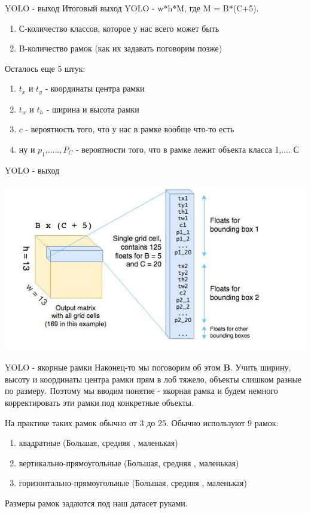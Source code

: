 \documentclass[notes,12pt, aspectratio=169]{beamer}
\begin{document}
\begin{frame}{YOLO - выход}
	Итоговый выход YOLO - w*h*M, где M = B*(C+5).
		\begin{enumerate}
		\item С-количество классов, которое у нас всего может быть
		\item B-количество рамок (как их задавать поговорим позже)
	\end{enumerate}
Осталось еще 5 штук:
\begin{enumerate}
	\item $t_x$ и $t_y$ - координаты центра рамки
	\item $t_w$ и $t_h$ - ширина и высота рамки
	\item $c$ - вероятность того, что у нас в рамке вообще что-то есть
	\item ну и $p_1$,.....$,P_C$ - вероятности того, что в рамке лежит объекта класса 1,.... С
\end{enumerate}
	
\end{frame}

\begin{frame}{YOLO - выход}
\begin{center}
	\includegraphics[width=1\linewidth]{output.jpg}
\end{center}
	
\end{frame}


\begin{frame}{YOLO - якорные рамки}
Наконец-то мы поговорим об этом \textbf{B}. Учить ширину, высоту и координаты центра рамки прям в лоб тяжело, объекты слишком разные по размеру. Поэтому мы вводим понятие - якорная рамка и будем немного корректировать эти рамки под конкретные объекты.

На практике таких рамок обычно от 3 до 25. Обычно используют 9 рамок:
\begin{enumerate}
	\item квадратные (Большая, средняя , маленькая)
	\item вертикально-прямоугольные (Большая, средняя , маленькая)
	\item горизонтально-прямоугольные (Большая, средняя , маленькая)
\end{enumerate}
Размеры рамок задаются под наш датасет руками.
	
\end{frame} 
\end{document}
